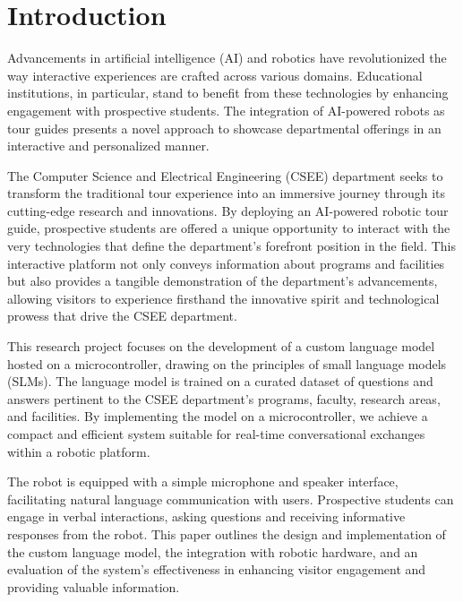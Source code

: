 \documentclass[conference]{IEEEtran}
\begin{document}

\section{Introduction}
Advancements in artificial intelligence (AI) and robotics have revolutionized the way interactive experiences are crafted across various domains. 
Educational institutions, in particular, stand to benefit from these technologies by enhancing engagement with prospective students. 
The integration of AI-powered robots as tour guides presents a novel approach to showcase departmental offerings in an interactive and personalized manner.

The Computer Science and Electrical Engineering (CSEE) department seeks to transform the traditional tour experience into an immersive journey through its cutting-edge research and innovations. 
By deploying an AI-powered robotic tour guide, prospective students are offered a unique opportunity to interact with the very technologies that define the department's forefront position in the field. 
This interactive platform not only conveys information about programs and facilities but also provides a tangible demonstration of the department's advancements, allowing visitors to experience firsthand the innovative spirit and technological prowess that drive the CSEE department.

This research project focuses on the development of a custom language model hosted on a microcontroller, drawing on the principles of small language models (SLMs). 
The language model is trained on a curated dataset of questions and answers pertinent to the CSEE department's programs, faculty, research areas, and facilities. 
By implementing the model on a microcontroller, we achieve a compact and efficient system suitable for real-time conversational exchanges within a robotic platform.

The robot is equipped with a simple microphone and speaker interface, facilitating natural language communication with users. 
Prospective students can engage in verbal interactions, asking questions and receiving informative responses from the robot. 
This paper outlines the design and implementation of the custom language model, the integration with robotic hardware, and an evaluation of the system's effectiveness in enhancing visitor engagement and providing valuable information.
\end{document}
